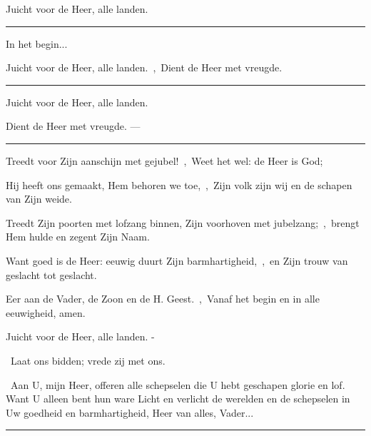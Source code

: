 \documentclass[12pt,twoside,a5paper]{article}
\begin{document}
\begin{halfparskip}
   Juicht voor de Heer, alle landen.

  \noindent\rule{\textwidth}{0.5pt}

    In het begin...

  Juicht voor de Heer, alle landen.~\sep\ Dient de Heer met vreugde.

  \noindent\rule{\textwidth}{0.5pt}

   

  Juicht voor de Heer, alle landen.

  Dient de Heer met vreugde. --- 

  \noindent\rule{\textwidth}{0.5pt}

   Treedt voor Zijn aanschijn met gejubel!~\sep\ Weet het wel: de Heer is God;

  Hij heeft ons gemaakt, Hem behoren we toe,~\sep\ Zijn volk zijn wij en de schapen van Zijn weide.

  Treedt Zijn poorten met lofzang binnen, Zijn voorhoven met jubelzang;~\sep\ brengt Hem hulde en zegent Zijn Naam.

  Want goed is de Heer: eeuwig duurt Zijn barmhartigheid,~\sep\ en Zijn trouw van geslacht tot geslacht.

  Eer aan de Vader, de Zoon en de H. Geest.~\sep\ Vanaf het begin en in alle eeuwigheid, amen.

  Juicht voor de Heer, alle landen. - 
\end{halfparskip}

\begin{halfparskip}
  \dd~Laat ons bidden; vrede zij met ons.

  \cc~Aan U, mijn Heer, offeren alle schepselen die U hebt geschapen glorie en lof. Want U alleen bent hun ware Licht en verlicht de werelden en de schepselen in Uw goedheid en barmhartigheid, Heer van alles, Vader...
\end{halfparskip}

\noindent\rule{\textwidth}{0.5pt}
\end{document}
